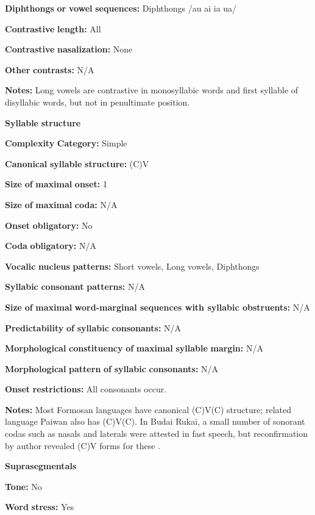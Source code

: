 \textbf{Diphthongs} \textbf{or} \textbf{vowel} \textbf{sequences:} Diphthongs /au ai ia ua/

\textbf{Contrastive} \textbf{length:} All

\textbf{Contrastive} \textbf{nasalization:} None

\textbf{Other} \textbf{contrasts:} N/A

\textbf{Notes:} Long vowels are contrastive in monosyllabic words and first syllable of disyllabic words, but not in penultimate position.

\textbf{Syllable} \textbf{structure}

\textbf{Complexity} \textbf{Category:} Simple

\textbf{Canonical} \textbf{syllable} \textbf{structure:} (C)V \citep[211-18]{Chen2006}

\textbf{Size} \textbf{of} \textbf{maximal} \textbf{onset:} 1

\textbf{Size} \textbf{of} \textbf{maximal} \textbf{coda:} N/A

\textbf{Onset} \textbf{obligatory:} No

\textbf{Coda} \textbf{obligatory:} N/A

\textbf{Vocalic} \textbf{nucleus} \textbf{patterns:} Short vowels, Long vowels, Diphthongs

\textbf{Syllabic} \textbf{consonant} \textbf{patterns:} N/A

\textbf{Size} \textbf{of} \textbf{maximal} \textbf{word{}-marginal sequences with syllabic obstruents:} N/A

\textbf{Predictability} \textbf{of} \textbf{syllabic} \textbf{consonants:} N/A

\textbf{Morphological} \textbf{constituency} \textbf{of} \textbf{maximal} \textbf{syllable} \textbf{margin:} N/A

\textbf{Morphological} \textbf{pattern} \textbf{of} \textbf{syllabic} \textbf{consonants:} N/A

\textbf{Onset} \textbf{restrictions:} All consonants occur.

\textbf{Notes:} Most Formosan languages have canonical (C)V(C) structure; related language Paiwan also has (C)V(C). In Budai Rukai, a small number of sonorant codas such as nasals and laterals were attested in fast speech, but reconfirmation by author revealed (C)V forms for these \citep[213]{Chen2006}.

\textbf{Suprasegmentals}

\textbf{Tone:} No

\textbf{Word} \textbf{stress:} Yes

